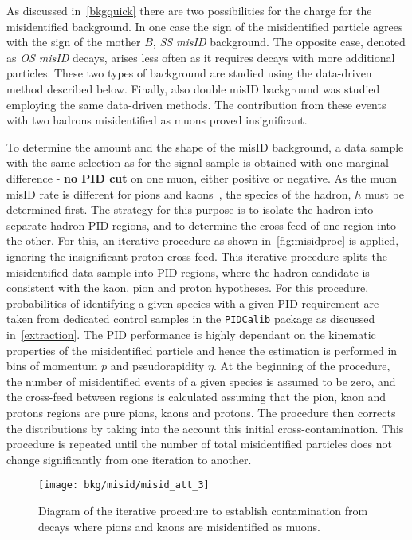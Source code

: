As discussed in~\autoref{bkgquick} there are two possibilities for the charge for the misidentified background. In one case the sign of the misidentified particle agrees with the sign of the mother $B$, \textit{SS misID} background. The opposite case, denoted as \textit{OS misID} decays, arises less often as it requires decays with more additional particles. These two types of background are studied using the data-driven method described below. Finally, also double misID background was studied employing the same data-driven methods. The contribution from these events with two hadrons misidentified as muons proved insignificant.


To determine the amount and the shape of the misID background, a data sample with the same selection as for the signal sample is obtained with one marginal difference - \textbf{no \gls{PID} cut} on one muon, either positive or negative. As the muon misID rate is different for pions and kaons~\cite{LHCb-DP-2013-001}, the species of the hadron, $h$ must be determined first. The strategy for this purpose is to isolate the hadron into separate hadron \gls{PID} regions, and to determine the cross-feed of one region into the other. For this, an iterative procedure as shown in~\autoref{fig:misidproc} is applied, ignoring the insignificant proton cross-feed. This iterative procedure splits the misidentified data sample into \gls{PID} regions, where the hadron candidate is consistent with the kaon, pion and proton hypotheses. For this procedure, probabilities of identifying a given species with a given \gls{PID} requirement are taken from dedicated control samples in the \texttt{PIDCalib} package \cite{Anderlini:2202412} as discussed in~\autoref{extraction}. The \gls{PID} performance is highly dependant on the kinematic properties of the misidentified particle and hence the estimation is performed in bins of momentum $p$ and pseudorapidity $\eta$.
At the beginning of the procedure, the number of misidentified events of a given species is assumed to be zero, and the
cross-feed between regions is calculated assuming that the pion, kaon and protons regions are pure pions, kaons and protons.
The procedure then corrects the distributions by taking into the account this initial cross-contamination.
This procedure is repeated until the number of total misidentified particles does not change significantly from one iteration to another.

\begin{figure}[h]
  \begin{center}
    \texttt{[image: bkg/misid/misid\_att\_3]}%
    \vspace*{-0.5cm}
  \end{center}
  \caption{
    Diagram of the iterative procedure to establish contamination from decays where pions and kaons are misidentified as muons.
    }
  \label{fig:misidproc}
\end{figure}



